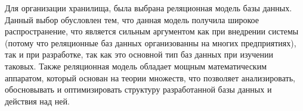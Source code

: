 \indent Для организации хранилища, была выбрана реляционная модель базы данных.
Данный выбор обусловлен тем, что данная модель получила широкое распространение, что является сильным аргументом как при внедрении системы (потому что реляционные баз данных организованны на многих предприятиях), так и при разработке, так как это основной тип баз данных при изучении таковых.
Также реляционная модель обладает мощным математическим аппаратом, который основан на теории множеств, что позволяет анализировать, обосновывать и оптимизировать структуру разработанной базы данных и действия над ней.


